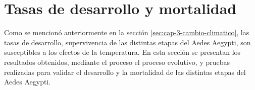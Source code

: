 \section{Tasas de desarrollo y mortalidad}

Como se mencionó anteriormente en la sección \ref{sec:cap-3-cambio-climatico}, las tasas de desarrollo,
supervivencia de las distintas etapas del Aedes Aegypti, son susceptibles a los efectos de la 
temperatura. En esta sección se presentan los resultados obtenidos, mediante el proceso el proceso
evolutivo, y pruebas realizadas para validar el desarrollo y la mortalidad de las distintas etapas del
Aedes Aegypti.









